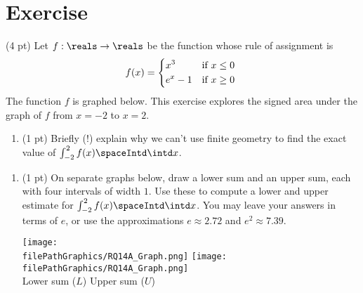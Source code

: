 %
%
%
%

\section{Exercise}


(4 pt) Let $f : \reals \rightarrow \reals$ be the function whose rule of assignment is
\begin{align*}
f(x)
=
\begin{dcases*}
x^{3}		&	if $x \leq 0$		\\
e^{x} - 1	&	if $x \geq 0$
\end{dcases*}
\end{align*}
The function $f$ is graphed below. This exercise explores the signed area under the graph of $f$ from $x = -2$ to $x = 2$.



\begin{enumerate}[label=(\alph*)]
\item\label{itm : RQ14Aa} (1 pt) Briefly (!) explain why we can't use finite geometry to find the exact value of $\int_{-2}^{2} f(x) \spaceIntd \intd x$.
\end{enumerate}




\begin{enumerate}[resume,label=(\alph*)]
\item\label{itm : RQ14Ab} (1 pt) On separate graphs below, draw a lower sum and an upper sum, each with four intervals of width $1$. Use these to compute a lower and upper estimate for $\int_{-2}^{2} f(x) \spaceIntd \intd x$. You may leave your answers in terms of $e$, or use the approximations $e \approx 2.72$ and $e^{2} \approx 7.39$.
\begin{center}
\texttt{[image: \\filePathGraphics/RQ14A\_Graph.png]}%
\hspace{1in}
\texttt{[image: \\filePathGraphics/RQ14A\_Graph.png]}%
\\
Lower sum ($L$)
\hspace{2in}
Upper sum ($U$)
\end{center}
\end{enumerate}

